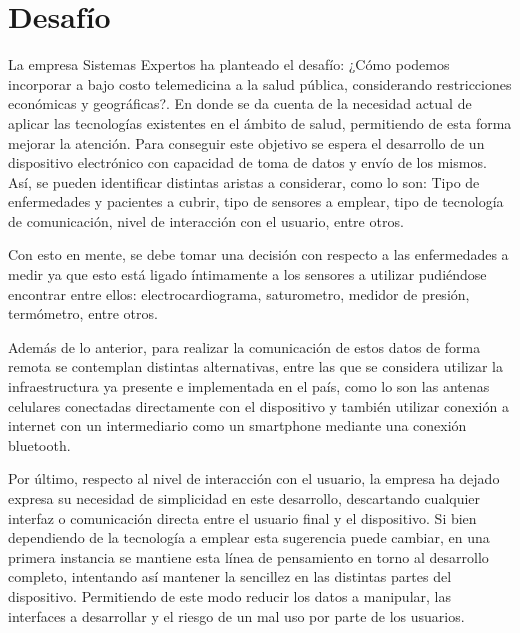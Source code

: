 \section{Desafío}
La empresa Sistemas Expertos ha planteado el desafío: ¿Cómo podemos incorporar a bajo costo telemedicina a la salud pública, considerando restricciones económicas y geográficas?. 
En donde se da cuenta de la necesidad actual de aplicar las tecnologías existentes en el ámbito de salud, permitiendo de esta forma mejorar la atención. Para conseguir este objetivo se espera el desarrollo de un dispositivo electrónico con capacidad de toma de datos y envío de los mismos. Así, se pueden identificar distintas aristas a considerar, como lo son: Tipo de enfermedades y pacientes a cubrir, tipo de sensores a emplear, tipo de tecnología de comunicación, nivel de interacción con el usuario, entre otros.

Con esto en mente, se debe tomar una decisión con respecto a las enfermedades a medir ya que esto está ligado íntimamente a los sensores a utilizar pudiéndose encontrar entre ellos: electrocardiograma, saturometro, medidor de presión, termómetro, entre otros.

Además de lo anterior, para realizar la comunicación de estos datos de forma remota se contemplan distintas alternativas, entre las que se considera utilizar la infraestructura ya presente e implementada en el país, como lo son las antenas celulares conectadas directamente con el dispositivo y también utilizar conexión a internet con un intermediario como un smartphone mediante una conexión bluetooth.

Por último, respecto al nivel de interacción con el usuario, la empresa ha dejado expresa su necesidad de simplicidad en este desarrollo, descartando cualquier interfaz o comunicación directa entre el usuario final y el dispositivo. Si bien dependiendo de la tecnología a emplear esta sugerencia puede cambiar, en una primera instancia se mantiene esta línea de pensamiento en torno al desarrollo completo, intentando así mantener la sencillez en las distintas partes del dispositivo. Permitiendo de este modo reducir los datos a manipular, las interfaces a desarrollar y el riesgo de un mal uso por parte de los usuarios.